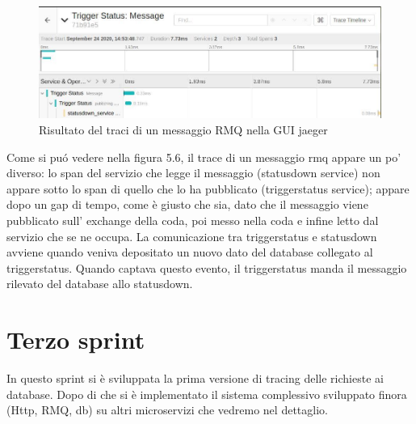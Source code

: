 \documentclass[a4paper,12pt,titlepage,italian,openany]{report}
\begin{document}
\begin{figure}[H]
    \includegraphics[scale=0.5]{45.jpg}
    \centering
    \caption{Risultato del traci di un messaggio RMQ nella GUI jaeger}
\end{figure}
Come si puó vedere nella figura 5.6, il trace di un messaggio rmq appare un po' diverso: lo span del servizio che legge il messaggio (statusdown service) non appare sotto lo span di quello che lo ha pubblicato (triggerstatus service); appare dopo un gap di tempo, come è giusto che sia, dato che il messaggio viene pubblicato sull' exchange della coda, poi messo nella coda e infine letto dal servizio che se ne occupa.
La comunicazione tra triggerstatus e statusdown avviene quando veniva depositato un nuovo dato del database collegato al triggerstatus. Quando captava questo evento, il triggerstatus manda il messaggio rilevato del database allo statusdown.

\newpage
\section{Terzo sprint}
In questo sprint si è sviluppata la prima versione di tracing delle richieste ai database. Dopo di che si è implementato il sistema complessivo sviluppato finora (Http, RMQ, db) su altri microservizi che vedremo nel dettaglio.
\end{document}
